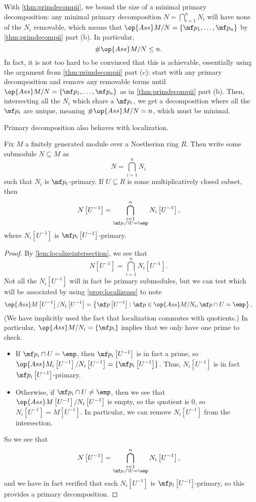 \documentclass[../notes.tex]{subfiles}
\begin{document}
\begin{remark}[Nir] \label{rem:findminimalprimdecomp}
	With \autoref{thm:primdecompii}, we bound the size of a minimal primary decomposition: any minimal primary decomposition $N=\bigcap_{i=1}^nN_i$ will have none of the $N_i$ removable, which means that $\op{Ass}M/N=\{\mf p_1,\ldots,\mf p_n\}$ by \autoref{thm:primdecompii} part (b). In particular,
	\[\#\op{Ass}M/N\le n.\]
	In fact, it is not too hard to be convinced that this is achievable, essentially using the argument from \autoref{thm:primdecompii} part (c): start with any primary decomposition and remove any removable terms until $\op{Ass}M/N=\{\mf p_1,\ldots,\mf p_n\}$ as in \autoref{thm:primdecompii} part (b). Then, intersecting all the $N_i$ which share a $\mf p_i$, we get a decomposition where all the $\mf p_i$ are unique, meaning $\#\op{Ass}M/N=n$, which must be minimal.
\end{remark}
Primary decomposition also behaves with localization.
\begin{theorem}
	Fix $M$ a finitely generated module over a Noetherian ring $R$. Then write some submodule $N\subseteq M$ as
	\[N=\bigcap_{i=1}^nN_i\]
	such that $N_i$ is $\mf p_i$-primary. If $U\subseteq R$ is some multiplicatively closed subset, then
	\[N\left[U^{-1}\right]=\bigcap_{\substack{i=1\\\mf p_i\cap U=\emp}}^nN_i\left[U^{-1}\right],\]
	where $N_i\left[U^{-1}\right]$ is $\mf p_i\left[U^{-1}\right]$-primary.
\end{theorem}
\begin{proof}
	By \autoref{lem:localizeintersection}, we see that
	\[N\left[U^{-1}\right]=\bigcap_{i=1}^nN_i\left[U^{-1}\right].\]
	Not all the $N_i\left[U^{-1}\right]$ will in fact be primary submodules, but we can test which will be associated by using \autoref{prop:localizeass} to note
	\[\op{Ass}M\left[U^{-1}\right]/N_i\left[U^{-1}\right]=\left\{\mf p\left[U^{-1}\right]:\mf p\in\op{Ass}M/N_i,\mf p\cap U=\emp\right\}.\]
	(We have implicitly used the fact that localization commutes with quotients.) In particular, $\op{Ass}M/N_i=\{\mf p_i\}$ implies that we only have one prime to check.
	\begin{itemize}
		\item If $\mf p_i\cap U=\emp$, then $\mf p_i\left[U^{-1}\right]$ is in fact a prime, so $\op{Ass}M_i\left[U^{-1}\right]/N_i\left[U^{-1}\right]=\{\mf p_i\left[U^{-1}\right]\}$. Thus, $N_i\left[U^{-1}\right]$ is in fact $\mf p_i\left[U^{-1}\right]$-primary.
		\item Otherwise, if $\mf p_i\cap U\ne\emp$, then we see that $\op{Ass}M\left[U^{-1}\right]/N_i\left[U^{-1}\right]$ is empty, so the quotient is $0$, so $N_i\left[U^{-1}\right]=M\left[U^{-1}\right]$. In particular, we can remove $N_i\left[U^{-1}\right]$ from the intersection.
	\end{itemize}
	So we see that
	\[N\left[U^{-1}\right]=\bigcap_{\substack{i=1\\\mf p_i\cap U=\emp}}^nN_i\left[U^{-1}\right],\]
	and we have in fact verified that each $N_i\left[U^{-1}\right]$ is $\mf p_i\left[U^{-1}\right]$-primary, so this provides a primary decomposition.
\end{proof}
\end{document}

